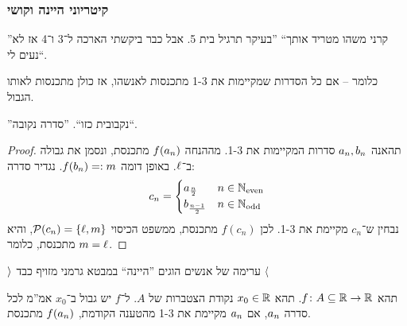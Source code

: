 \documentclass[name=רשימות חשבון דיפרנציאלי ואינטגרלי 1א]{../../../tex/classes/megasumPreamble}
\begin{document}
	

	\subsubsection{קיטריוני היינה וקושי}
	
	''קרני משהו מטריד אותך`` ''בעיקר תרגיל בית 5. אבל כבר ביקשתי הארכה ל־3 ו־4 אז לא נעים לי``.
	
	כלומר – אם כל הסדרות שמקיימות את 1-3 מתכנסות לאנשהו, אז כולן מתכנסות לאותו הגבול.
	
	''נקבובית כזו``. ''סדרה נקובה\en{!}``.
	
	\begin{proof}
		תהאנה $a_n, b_n$ סדרות המקיימות את 1-3. מההנחה $f(a_n)$ מתכנסת, ונסמן את גבולה ב־$\ell$. באופן דומה $f(b_n) =: m$. נגדיר סדרה:
		\[ c_n = \begin{cases}
			a_{\frac{n}{2}} & n \in \mathbb{N}_{\mathrm{even}} \\
			b_{\frac{n - 1}{2}} & n \in \mathbb{N}_{\mathrm{odd }}
		\end{cases} \]
		נבחין ש־$c_n$ מקיימת את 1-3. לכן $f(c_n)$ מתכנסת, ממשפט הכיסוי $\mathcal{P}(c_n) = \{\ell, m\}$, והיא מתכנסת, כלומר $m = \ell$.
	\end{proof}
	
	$\rangle$ ערימה של אנשים הוגים ''היינה`` במבטא גרמני מזויף כבד $\langle$

	\begin{Theorem}
		תהא $f \colon A \subseteq \mathbb{R} \to \mathbb{R}$. תהא $x_0 \in \mathbb{R}$ נקודת הצטברות של $A$. ל־$f$ יש גבול ב־$x_0$ אמ''מ לכל סדרה $a_n$, אם $a_n$ מקיימת את 1-3 מהטענה הקודמת, $f(a_n)$ מתכנסת. 
	\end{Theorem}
\end{document}
